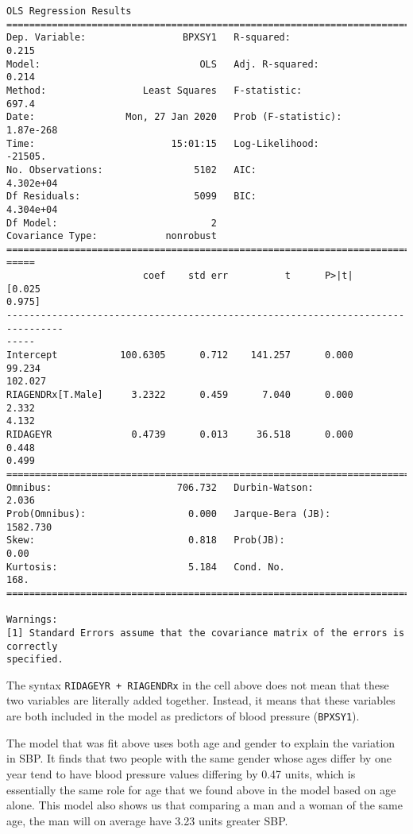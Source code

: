 \documentclass[11pt]{article}
\begin{document}
    \begin{Verbatim}[commandchars=\\\{\}]
                            OLS Regression Results
==============================================================================
Dep. Variable:                 BPXSY1   R-squared:                       0.215
Model:                            OLS   Adj. R-squared:                  0.214
Method:                 Least Squares   F-statistic:                     697.4
Date:                Mon, 27 Jan 2020   Prob (F-statistic):          1.87e-268
Time:                        15:01:15   Log-Likelihood:                -21505.
No. Observations:                5102   AIC:                         4.302e+04
Df Residuals:                    5099   BIC:                         4.304e+04
Df Model:                           2
Covariance Type:            nonrobust
================================================================================
=====
                        coef    std err          t      P>|t|      [0.025
0.975]
--------------------------------------------------------------------------------
-----
Intercept           100.6305      0.712    141.257      0.000      99.234
102.027
RIAGENDRx[T.Male]     3.2322      0.459      7.040      0.000       2.332
4.132
RIDAGEYR              0.4739      0.013     36.518      0.000       0.448
0.499
==============================================================================
Omnibus:                      706.732   Durbin-Watson:                   2.036
Prob(Omnibus):                  0.000   Jarque-Bera (JB):             1582.730
Skew:                           0.818   Prob(JB):                         0.00
Kurtosis:                       5.184   Cond. No.                         168.
==============================================================================

Warnings:
[1] Standard Errors assume that the covariance matrix of the errors is correctly
specified.
\end{Verbatim}

    The syntax \texttt{RIDAGEYR\ +\ RIAGENDRx} in the cell above does not
mean that these two variables are literally added together. Instead, it
means that these variables are both included in the model as predictors
of blood pressure (\texttt{BPXSY1}).

    The model that was fit above uses both age and gender to explain the
variation in SBP. It finds that two people with the same gender whose
ages differ by one year tend to have blood pressure values differing by
0.47 units, which is essentially the same role for age that we found
above in the model based on age alone. This model also shows us that
comparing a man and a woman of the same age, the man will on average
have 3.23 units greater SBP.
\end{document}
